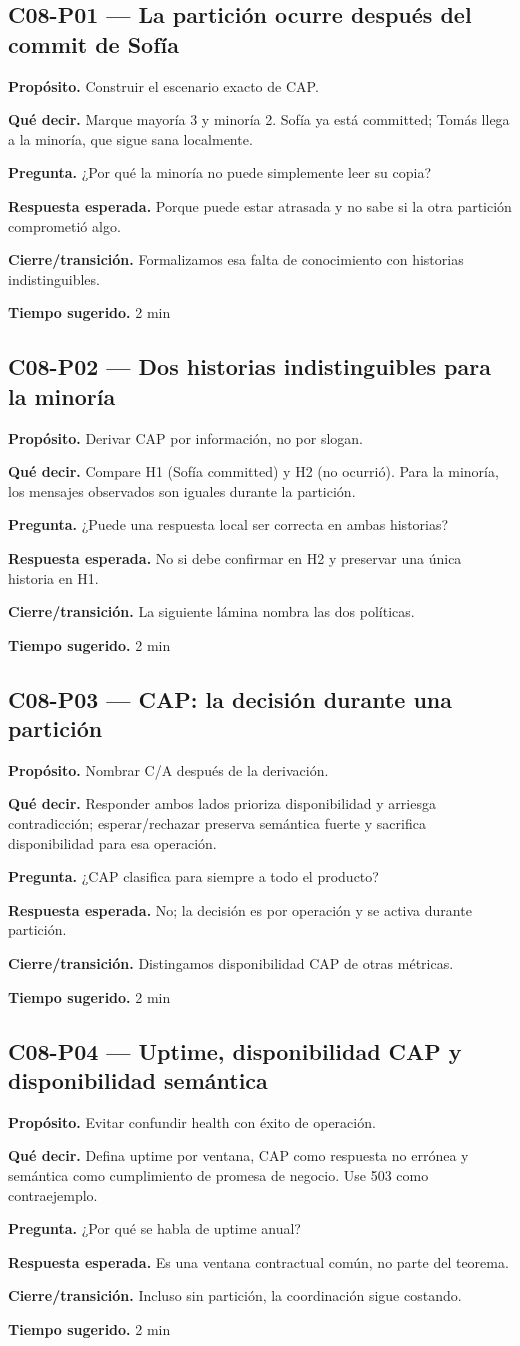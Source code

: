 \documentclass[variant=docente,cover=institutional,mode=screen]{ua-engineering-v6-article}
\newcommand{\FrameField}[2]{\par\noindent\textbf{#1.} #2\par}
\begin{document}
\subsection*{C08-P01 --- La partición ocurre después del commit de Sofía}
\FrameField{Propósito}{Construir el escenario exacto de CAP.}
\FrameField{Qué decir}{Marque mayoría 3 y minoría 2. Sofía ya está committed; Tomás llega a la minoría, que sigue sana localmente.}
\FrameField{Pregunta}{¿Por qué la minoría no puede simplemente leer su copia?}
\FrameField{Respuesta esperada}{Porque puede estar atrasada y no sabe si la otra partición comprometió algo.}
\FrameField{Cierre/transición}{Formalizamos esa falta de conocimiento con historias indistinguibles.}
\FrameField{Tiempo sugerido}{2 min}

\subsection*{C08-P02 --- Dos historias indistinguibles para la minoría}
\FrameField{Propósito}{Derivar CAP por información, no por slogan.}
\FrameField{Qué decir}{Compare H1 (Sofía committed) y H2 (no ocurrió). Para la minoría, los mensajes observados son iguales durante la partición.}
\FrameField{Pregunta}{¿Puede una respuesta local ser correcta en ambas historias?}
\FrameField{Respuesta esperada}{No si debe confirmar en H2 y preservar una única historia en H1.}
\FrameField{Cierre/transición}{La siguiente lámina nombra las dos políticas.}
\FrameField{Tiempo sugerido}{2 min}

\subsection*{C08-P03 --- CAP: la decisión durante una partición}
\FrameField{Propósito}{Nombrar C/A después de la derivación.}
\FrameField{Qué decir}{Responder ambos lados prioriza disponibilidad y arriesga contradicción; esperar/rechazar preserva semántica fuerte y sacrifica disponibilidad para esa operación.}
\FrameField{Pregunta}{¿CAP clasifica para siempre a todo el producto?}
\FrameField{Respuesta esperada}{No; la decisión es por operación y se activa durante partición.}
\FrameField{Cierre/transición}{Distingamos disponibilidad CAP de otras métricas.}
\FrameField{Tiempo sugerido}{2 min}

\subsection*{C08-P04 --- Uptime, disponibilidad CAP y disponibilidad semántica}
\FrameField{Propósito}{Evitar confundir health con éxito de operación.}
\FrameField{Qué decir}{Defina uptime por ventana, CAP como respuesta no errónea y semántica como cumplimiento de promesa de negocio. Use 503 como contraejemplo.}
\FrameField{Pregunta}{¿Por qué se habla de uptime anual?}
\FrameField{Respuesta esperada}{Es una ventana contractual común, no parte del teorema.}
\FrameField{Cierre/transición}{Incluso sin partición, la coordinación sigue costando.}
\FrameField{Tiempo sugerido}{2 min}
\end{document}
